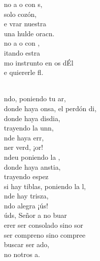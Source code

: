 \begin{cancion}%
	\begin{chorus}%
	no a o con s,\\
	 solo cozón,\\
	e vrar nuestra   \\
	 una hulde oracn.\\
	no a o con , \\
	itando estra \\
	mo instrunto en os dÉl\\
	e quiererle fl.\\
	\end{chorus}%
	\jump\\
	ndo, poniendo tu ar,\\
	donde haya onsa, el perdón di,\\
	donde haya disdia, \\
	trayendo la unn,\\
	nde haya err, \\
	ner verd, ¡or! \\
	ndeu poniendo la ,\\
	donde haya anstia,\\
	trayendo espez\\
	si hay tiblas, poniendo la l,\\
	nde hay trisza, \\
	ndo alegra ¡ús!\\
	úds, Señor a no buar\\
	erer ser consolado sino sor\\
	ser compreno sino compree\\
	 buscar ser ado,\\
	no notros a.\\
\end{cancion}%
